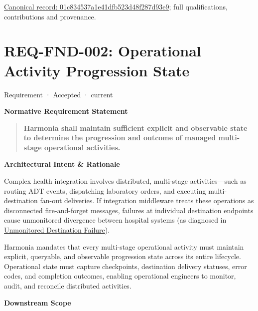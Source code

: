 {\footnotesize \href{../../../../continuum/motivation/requirement/01c834537a1e41dfb523d48f287d93e9.md}{Canonical record: 01c834537a1e41dfb523d48f287d93e9}; full qualifications, contributions and provenance.}\par
\section{REQ-FND-002: Operational Activity Progression State}

\label{element:eaabcdb96aad4f32a050c94f9ecec049}
{\small Requirement · Accepted · current}\par

\par\medskip\textbf{Normative Requirement Statement}\par


\begin{quote}


\textbf{Harmonia shall maintain sufficient explicit and observable state to determine the progression and outcome of managed multi-stage operational activities.}



\end{quote}


\par\medskip\textbf{Architectural Intent \& Rationale}\par


Complex health integration involves distributed, multi-stage activities—such as routing ADT events, dispatching laboratory orders, and executing multi-destination fan-out deliveries. If integration middleware treats these operations as disconnected fire-and-forget messages, failures at individual destination endpoints cause unmonitored divergence between hospital systems (as diagnosed in \href{\detokenize{../../../../../docs/markdown/01-motivation/drivers-assessments/assessments.md}}{Unmonitored Destination Failure}).



Harmonia mandates that every multi-stage operational activity must maintain explicit, queryable, and observable progression state across its entire lifecycle. Operational state must capture checkpoints, destination delivery statuses, error codes, and completion outcomes, enabling operational engineers to monitor, audit, and reconcile distributed activities.



\par\medskip\textbf{Downstream Scope}\par


